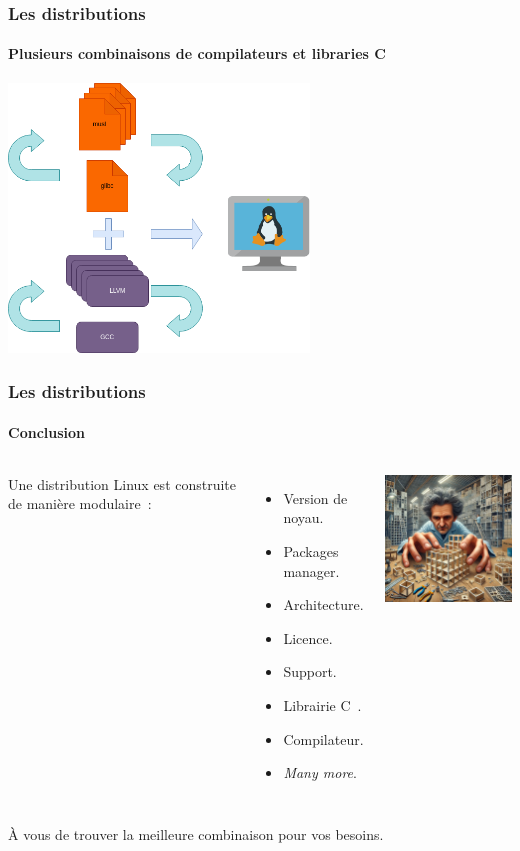 \documentclass{beamer}
\begin{document}
    \begin{frame}
        \transdissolve
        \frametitle{Les distributions}
        \framesubtitle{Plusieurs combinaisons de compilateurs et libraries C}
        \centering
        \includegraphics[width=8cm]{image/interchange-lib-compiler.drawio}
    \end{frame}

    \begin{frame}
        \transdissolve
        \frametitle{Les distributions}
        \framesubtitle{Conclusion}
        \begin{columns}
            Une distribution Linux est construite de manière modulaire~:
            \begin{itemize}
                \item Version de noyau.
                \item Packages manager.
                \item Architecture.
                \item Licence.
                \item Support.
                \item Librairie C~.
                \item Compilateur.
                \item \textit{Many more}.
            \end{itemize}
            \centering
            \includegraphics[width=5.5cm]{image/craftsman-focused}
        \end{columns}
        \bigbreak
        À vous de trouver la meilleure combinaison pour vos besoins.
    \end{frame}
\end{document}
